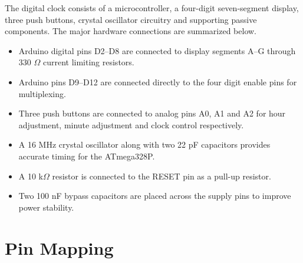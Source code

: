\documentclass[12pt,a4paper]{article}
\begin{document}
The digital clock consists of a microcontroller, a four-digit seven-segment display, three push buttons, crystal oscillator circuitry and supporting passive components. The major hardware connections are summarized below.

\begin{itemize}

\item Arduino digital pins D2--D8 are connected to display segments A--G through 330 $\Omega$ current limiting resistors.

\item Arduino pins D9--D12 are connected directly to the four digit enable pins for multiplexing.

\item Three push buttons are connected to analog pins A0, A1 and A2 for hour adjustment, minute adjustment and clock control respectively.

\item A 16 MHz crystal oscillator along with two 22 pF capacitors provides accurate timing for the ATmega328P.

\item A 10 k$\Omega$ resistor is connected to the RESET pin as a pull-up resistor.

\item Two 100 nF bypass capacitors are placed across the supply pins to improve power stability.

\end{itemize}


\section{Pin Mapping}
\end{document}
